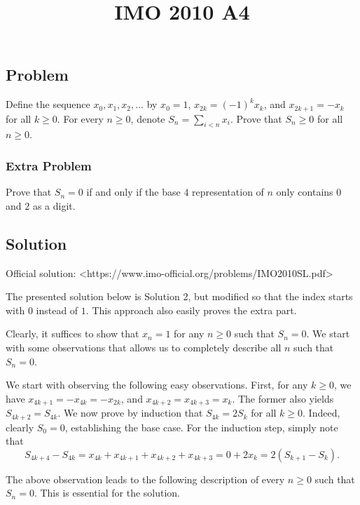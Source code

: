 \documentclass{article}
\title{IMO 2010 A4}
\author{}
\date{}
\begin{document}
\maketitle



\subsection*{Problem}

Define the sequence $x_0, x_1, x_2, \ldots$ by $x_0 = 1$, $x_{2k} = (-1)^k x_k$, and $x_{2k + 1} = -x_k$ for all $k \geq 0$.
For every $n \geq 0$, denote $S_n = \displaystyle \sum_{i < n} x_i$.
Prove that $S_n \geq 0$ for all $n \geq 0$.


\subsubsection*{Extra Problem}

Prove that $S_n = 0$ if and only if the base $4$ representation of $n$ only contains $0$ and $2$ as a digit.



\subsection*{Solution}

Official solution: <https://www.imo-official.org/problems/IMO2010SL.pdf>

The presented solution below is Solution 2, but modified so that the index starts with $0$ instead of $1$.
This approach also easily proves the extra part.

Clearly, it suffices to show that $x_n = 1$ for any $n \geq 0$ such that $S_n = 0$.
We start with some observations that allows us to completely describe all $n$ such that $S_n = 0$.

We start with observing the following easy observations.
First, for any $k \geq 0$, we have $x_{4k + 1} = -x_{4k} = -x_{2k}$, and $x_{4k + 2} = x_{4k + 3} = x_k$.
The former also yields $S_{4k + 2} = S_{4k}$.
We now prove by induction that $S_{4k} = 2 S_k$ for all $k \geq 0$.
Indeed, clearly $S_0 = 0$, establishing the base case.
For the induction step, simply note that
\[ S_{4k + 4} - S_{4k} = x_{4k} + x_{4k + 1} + x_{4k + 2} + x_{4k + 3} = 0 + 2 x_k = 2 (S_{k + 1} - S_k). \]

The above observation leads to the following description of every $n \geq 0$ such that $S_n = 0$.
This is essential for the solution.
\end{document}
